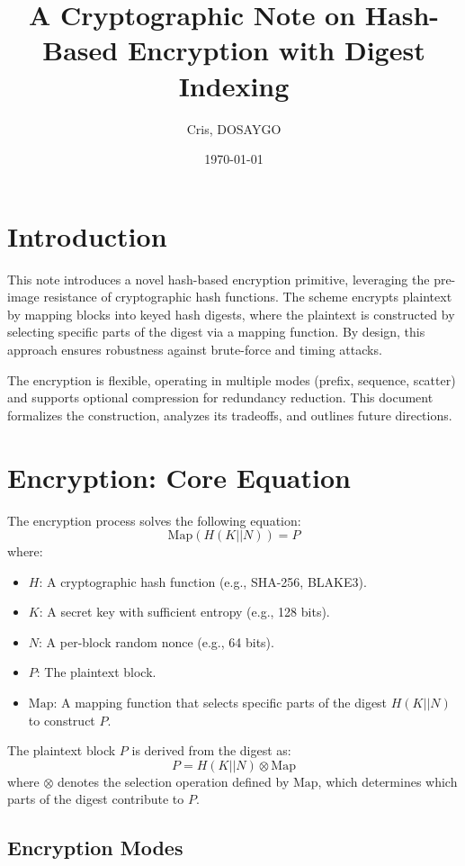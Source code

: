 \documentclass[11pt,a4paper]{article}
\title{A Cryptographic Note on Hash-Based Encryption with Digest Indexing}
\author{Cris, DOSAYGO}
\date{\today}
\begin{document}
\maketitle

\section*{Introduction}

This note introduces a novel hash-based encryption primitive, leveraging the pre-image resistance of cryptographic hash functions. The scheme encrypts plaintext by mapping blocks into keyed hash digests, where the plaintext is constructed by selecting specific parts of the digest via a mapping function. By design, this approach ensures robustness against brute-force and timing attacks.

The encryption is flexible, operating in multiple modes (prefix, sequence, scatter) and supports optional compression for redundancy reduction. This document formalizes the construction, analyzes its tradeoffs, and outlines future directions.

\section*{Encryption: Core Equation}

The encryption process solves the following equation:
\[
\text{Map}(H(K || N)) = P
\]
where:
\begin{itemize}
  \item \( H \): A cryptographic hash function (e.g., SHA-256, BLAKE3).
  \item \( K \): A secret key with sufficient entropy (e.g., 128 bits).
  \item \( N \): A per-block random nonce (e.g., 64 bits).
  \item \( P \): The plaintext block.
  \item \( \text{Map} \): A mapping function that selects specific parts of the digest \( H(K || N) \) to construct \( P \).
\end{itemize}

The plaintext block \( P \) is derived from the digest as:
\[
P = H(K || N) \otimes \text{Map}
\]
where \( \otimes \) denotes the selection operation defined by \( \text{Map} \), which determines which parts of the digest contribute to \( P \).

\subsection*{Encryption Modes}
\end{document}
